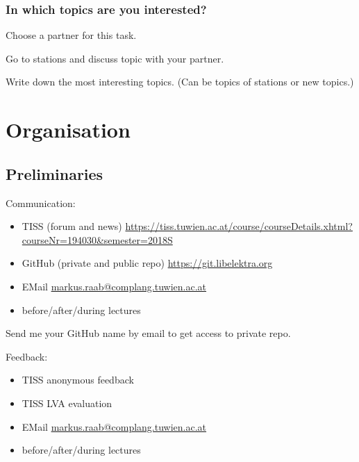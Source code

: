\documentclass{beamer}
\begin{document}
\begin{assignment}
	\frametitle{In which topics are you interested?}
	\begin{task}[1]
	Choose a partner for this task.
	\end{task}

	\begin{task}[2]
	Go to stations and discuss topic with your partner.
	\end{task}

	\begin{task}[3]
	Write down the most interesting topics.
	(Can be topics of stations or new topics.)
	\end{task}
\end{assignment}





\section{Organisation}

\subsection{Preliminaries}
\begin{frame}
	Communication:
	\begin{itemize}
		\item TISS (forum and news) \url{https://tiss.tuwien.ac.at/course/courseDetails.xhtml?courseNr=194030&semester=2018S}
		\item GitHub (private and public repo) \url{https://git.libelektra.org}
		\item EMail \url{markus.raab@complang.tuwien.ac.at}
		\item before/after/during lectures
	\end{itemize}
\end{frame}

\begin{assignment}
	\begin{task}
	Send me your GitHub name by email to get access to private repo.
	\end{task}
\end{assignment}

\begin{frame}
	Feedback:
	\begin{itemize}
		\item TISS anonymous feedback
		\item TISS LVA evaluation
		\item EMail \url{markus.raab@complang.tuwien.ac.at}
		\item before/after/during lectures
	\end{itemize}
\end{frame}
\end{document}

